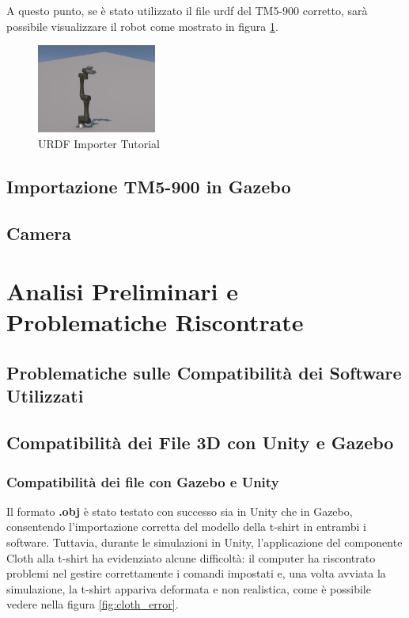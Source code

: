 \documentclass[11pt]{report}
\begin{document}
A questo punto, se è stato utilizzato il file urdf del TM5-900 corretto, sarà possibile visualizzare il robot come mostrato in figura \ref{fig:URDF_Importer_7}.
\begin{figure}[H]
    \centering
    \includegraphics[width=0.35\textwidth]{images/URDF_Importer_7.png}
    \caption{URDF Importer Tutorial}
    \label{fig:URDF_Importer_7}     
\end{figure}

\section{Importazione TM5-900 in Gazebo}

\section{Camera}

\chapter{Analisi Preliminari e Problematiche Riscontrate}

\section{Problematiche sulle Compatibilità dei Software Utilizzati}

\section{Compatibilità dei File 3D con Unity e Gazebo}

\subsection{Compatibilità dei file con Gazebo e Unity}
Il formato \textbf{.obj} è stato testato con successo sia in Unity che in Gazebo, consentendo l'importazione corretta del modello della t-shirt in entrambi i software. Tuttavia, durante le simulazioni in Unity, l'applicazione del componente Cloth alla t-shirt ha evidenziato alcune difficoltà: il computer ha riscontrato problemi nel gestire correttamente i comandi impostati e, una volta avviata la simulazione, la t-shirt appariva deformata e non realistica, come è possibile vedere nella figura \ref{fig:cloth_error}.
\end{document}
